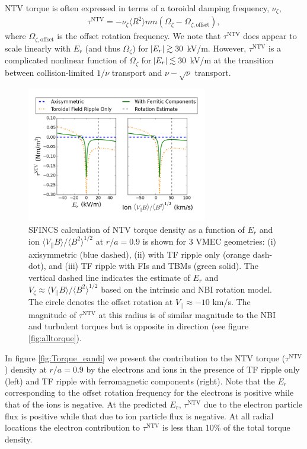 \documentclass[aip, pop, preprint]{revtex4-1}
\numberwithin{figure}{section}
\numberwithin{equation}{section}
\begin{document}
NTV torque is often expressed in terms of a toroidal damping frequency, $\nu_{\zeta}$,
\begin{gather}
\tau^{\text{NTV}} = - \nu_{\zeta} \langle R^2 \rangle m n ( \Omega_{\zeta} - \Omega_{\zeta, \text{offset}}),
\end{gather}
where $\Omega_{\zeta, \text{offset}}$ is the offset rotation frequency. We note that $\tau^{\text{NTV}}$ does appear to scale linearly with $E_r$ (and thus $\Omega_{\zeta}$) for $\abs{E_r} \gtrsim 30$ kV/m. However, $\tau^{\text{NTV}}$ is a complicated nonlinear function of $\Omega_{\zeta}$ for $\abs{E_r} \lesssim 30$ kV/m at the transition between collision-limited $1/\nu$ transport and $\nu-\sqrt{\nu}$ transport. 

\FloatBarrier

\begin{figure}[h!]
\centering
\includegraphics[width=0.7\textwidth]{Torque_ErandV.png}
\caption{\label{fig:Torque_ErandV} SFINCS calculation of NTV torque density as a function of $E_r$ and ion $\langle V_{||} B \rangle/\langle B^2 \rangle^{1/2}$ at $r/a = 0.9$ is shown for 3 VMEC geometries: (i) axisymmetric (blue dashed), (ii) with TF ripple only (orange dash-dot), and (iii) TF ripple with FIs and TBMs (green solid). The vertical dashed line indicates the estimate of $E_r$ and $V_{\zeta} \approx \langle V_{||} B \rangle/\langle B^2 \rangle^{1/2}$ based on the intrinsic and NBI rotation model. The circle denotes the offset rotation at $V_{||} \approx -10$ km/s. The magnitude of $\tau^{\text{NTV}}$ at this radius is of similar magnitude to the NBI and turbulent torques but is opposite in direction (see figure \ref{fig:alltorque}).}
\end{figure}

In figure \ref{fig:Torque_eandi} we present the contribution to the NTV torque ($\tau^{\text{NTV}}$) density at $r/a = 0.9$ by the electrons and ions in the presence of TF ripple only (left) and TF ripple with ferromagnetic components (right). Note that the $E_r$ corresponding to the offset rotation frequency for the electrons is positive while that of the ions is negative. At the predicted $E_r$, $\tau^{\text{NTV}}$ due to the electron particle flux is positive while that due to ion particle flux is negative. At all radial locations the electron contribution to $\tau^{\text{NTV}}$ is less than 10\% of the total torque density. 
\end{document}
